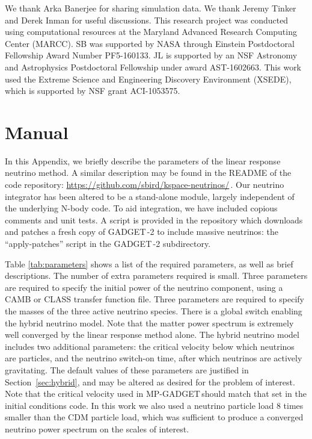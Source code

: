 \documentclass[useAMS, usenatbib]{mnras}
\newcommand{\gadget}{{\small GADGET\,}}
\begin{document}
We thank Arka Banerjee for sharing simulation data. We thank Jeremy Tinker and Derek Inman for useful discussions.
This research project was conducted using computational resources
at the Maryland Advanced Research Computing Center (MARCC). SB was supported by NASA through
Einstein Postdoctoral Fellowship Award Number PF5-160133. JL is supported by an NSF Astronomy and Astrophysics Postdoctoral Fellowship under award AST-1602663. This work used the Extreme Science and Engineering Discovery Environment (XSEDE), which is supported by NSF grant ACI-1053575.
\appendix

\section{Manual}
\label{sec:manual}

In this Appendix, we briefly describe the parameters of the linear response neutrino method. A similar description may be found in the README of the code repository: \url{https://github.com/sbird/kspace-neutrinos/}\,. Our neutrino integrator has been altered to be a stand-alone module, largely independent of the underlying N-body code. To aid integration, we have included copious comments and unit tests. A script is provided in the repository which downloads and patches a fresh copy of \gadget-2 to include massive neutrinos: the ``apply-patches'' script in the \gadget-2 subdirectory.

Table \ref{tab:parameters} shows a list of the required parameters, as well as brief descriptions. The number of extra parameters required is small. Three parameters are required to specify the initial power of the neutrino component, using a CAMB or CLASS transfer function file. Three parameters are required to specify the masses of the three active neutrino species.
There is a global switch enabling the hybrid neutrino model. Note that the matter power spectrum is extremely well converged by the linear response method alone. The hybrid neutrino model includes two additional parameters: the critical velocity below which neutrinos are particles, and the neutrino switch-on time, after which neutrinos are actively gravitating. The default values of these parameters are justified in Section~\ref{sec:hybrid}, and may be altered as desired for the problem of interest.
Note that the critical velocity used in MP-\gadget should match that set in the initial conditions code. In this work we also used a neutrino particle load $8$ times smaller than the CDM particle load, which was sufficient to produce a converged neutrino power spectrum on the scales of interest.
\end{document}

